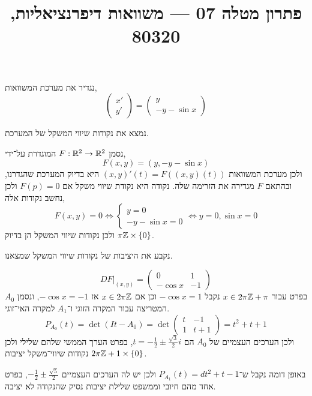 
\title{פתרון מטלה 07 --- משוואות דיפרנציאליות, 80320}

\usepackage{pgfplots, tikz, pgffor}
\usetikzlibrary{math}
\pgfplotsset{compat=1.18}


\maketitle
\maketitleprint[blue]{}

\question{}
נגדיר את מערכת המשוואות,
\[
	\begin{pmatrix}
		x' \\
		y'
	\end{pmatrix}
	= \begin{pmatrix}
		y \\
		-y - \sin x
	\end{pmatrix}
\]

\subquestion{}
נמצא את נקודות שיווי המשקל של המערכת.
\begin{solution}
	נסמן $F : \mathbb{R}^2 \to \mathbb{R}^2$ המוגדרת על־ידי,
	\[
		F(x, y) = (y, -y - \sin x)
	\]
	ולכן מערכת המשוואות $(x, y)'(t) = F((x, y)(t))$ היא בדיוק המערכת שהגדרנו, ובהתאם $F$ מגדירה את הזרימה שלה.
	נקודה היא נקודת שיווי משקל אם $F(p) = 0$ ולכן נחשב נקודות אלה,
	\[
		F(x, y) = 0
		\iff \begin{cases}
			y = 0 \\
			-y - \sin x = 0
		\end{cases}
		\iff y = 0, \sin x = 0
	\]
	ולכן נקודות שיווי המשקל הן בדיוק $\pi \mathbb{Z} \times \{ 0 \}$.
\end{solution}

\subquestion{}
נקבע את היציבות של נקודות שיווי המשקל שמצאנו.
\begin{solution}
	\[
		DF|_{(x, y)}
		= \begin{pmatrix}
			0 & 1 \\
			- \cos x & -1
		\end{pmatrix}
	\]
	בפרט עבור $x \in 2 \pi \mathbb{Z} + \pi$ נקבל $-\cos x = 1$ וכן אם $x \in 2 \pi \mathbb{Z}$ אז $-\cos x = -1$, ונסמן $A_0$ המטריצה עבור המקרה הזוגי ו־$A_1$ למקרה האי־זוגי.
	\[
		P_{A_0}(t)
		= \det(I t - A_0)
		= \det \begin{pmatrix}
			t & -1 \\
			1 & t + 1
		\end{pmatrix}
		= t^2 + t + 1
	\]
	ולכן הערכים העצמיים של $A_0$ הם $t = -\frac{1}{2} \pm \frac{\sqrt{3}}{2}i$, בפרט הערך הממשי שלהם שלילי ולכן $2 \pi \mathbb{Z} + 1 \times \{ 0 \}$ נקודות שיווי־משקל יציבות.

	באופן דומה נקבל ש־$P_{A_1}(t) = dt^2 + t - 1$ ולכן יש לה הערכים העצמיים $-\frac{1}{2} \pm \frac{\sqrt{5}}{2}$, בפרט אחד מהם חיובי וממשפט שלילת יציבות נסיק שהנקודה לא יציבה.
\end{solution}

